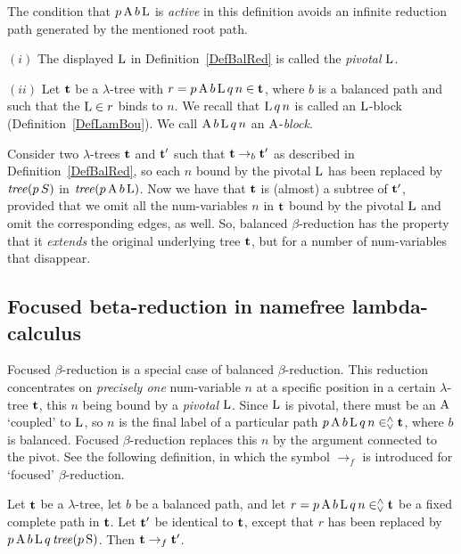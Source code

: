 \documentclass[submission,copyright,creativecommons]{eptcs}
\begin{document}
The condition that $p \, {\rm A} \, b \, {\rm L}$ is {\em active\/} in this definition avoids an infinite reduction path generated by the mentioned root path.

\begin{Def}\label{BalDefBlo}
$(i)$ The displayed ${\rm L}$ in Definition~\ref{DefBalRed} is called the {\em pivotal\/} ${\rm L}$.

$(ii)$ Let ${\bf t}$ be a $\lambda$-tree with $r = p \, {\rm A} \, b \, {\rm L} \, q \, n \in {\bf t}$, where $b$ is a balanced path and such that the ${\rm L} \in r$ binds to $n$. We recall that ${\rm L} \, q \, n$ is called an ${\rm L}$-block (Definition~\ref{DefLamBou}). We call ${\rm A} \, b \, {\rm L} \, q \, n$ an ${\rm A}$-{\it block\/}.
\end{Def} 

Consider two $\lambda$-trees ${\bf t}$ and ${\bf t}'$ such that ${\bf t} \rightarrow_b {\bf t}'$ as described in Definition~\ref{DefBalRed}, so each $n$ bound by the pivotal ${\rm L}$ has been replaced by ${\it tree}(p \, S)$ in ${\it tree}(p \, {\rm A} \, b \, {\rm L})$. Now we have that ${\bf t}$ is (almost) a subtree of ${{\bf t}}'$, provided that we omit all the num-variables $n$ in ${\bf t}$ bound by the pivotal ${\rm L}$ and omit the corresponding edges, as well. So, balanced $\beta$-reduction has the property that it {\it extends\/} the original underlying tree ${\bf t}$, but for a number of num-variables that disappear.






\subsection{Focused beta-reduction in namefree lambda-calculus}\label{SecFoc}

Focused $\beta$-reduction is a special case of balanced $\beta$-reduction. This reduction concentrates on {\it precisely one\/} num-variable $n$ at a specific position in a certain $\lambda$-tree ${\bf t}$, this $n$ being bound by a {\em pivotal\/} ${\rm L}$. Since ${\rm L}$ is pivotal, there must be an ${\rm A}$ `coupled' to ${\rm L}$, so $n$ is the final label of a particular path $p \, {\rm A} \, b \, {\rm L} \, q \, n \in^{\wedge}_{\vee} {\bf t}$, where $b$ is balanced. Focused $\beta$-reduction replaces this $n$ by the argument connected to the pivot. See the following definition, in which the symbol $\rightarrow_f$ is introduced for `focused' $\beta$-reduction.

\begin{Def}
Let ${\bf t}$ be a $\lambda$-tree, let $b$ be a balanced path, and let $r = p \, {\rm A} \, b \, {\rm L} \, q \, n \in^{\wedge}_{\vee} {\bf t}$ be a fixed complete path in ${\bf t}$. Let ${\bf t}'$ be identical to ${\bf t}$, except that $r$ has been replaced by $p \, {\rm A} \, b \, {\rm L} \, q \, {\it tree}(p \, {\rm S})$.
Then ${\bf t} \rightarrow_f {\bf t}'$.
\end{Def}
\end{document}
